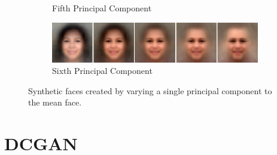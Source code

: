 \begin{figure}
\begin{subfigure}[b]{\textwidth}
        \caption{Fifth Principal Component}
    \end{subfigure}
    \begin{subfigure}[b]{\textwidth}
        \includegraphics[width=\textwidth]{fig/PCA/pca5}
        \caption{Sixth Principal Component}
    \end{subfigure}
    \caption{Synthetic faces created by varying a single principal component to the mean face.}
    \label{pca-components}
\end{figure}

\section{DCGAN}


